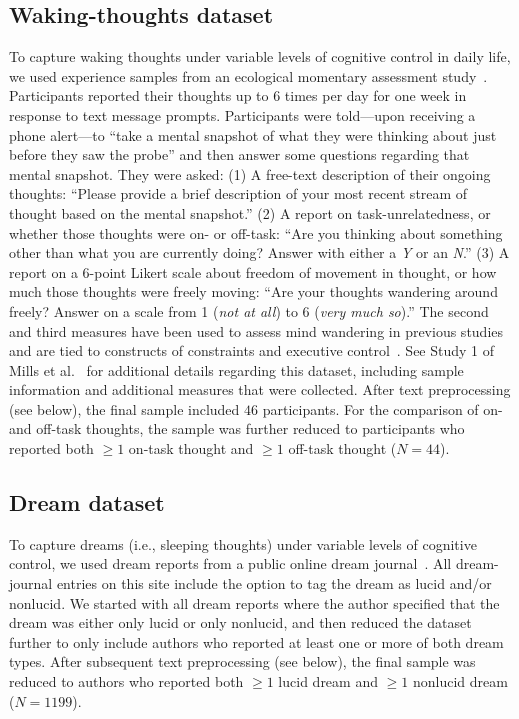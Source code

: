 \documentclass[10pt,a4paper,twocolumn]{article}
\begin{document}
\subsection*{Waking-thoughts dataset}
To capture waking thoughts under variable levels of cognitive control in daily life, we used experience samples from an ecological momentary assessment study~\cite{mills2021}. Participants reported their thoughts up to 6 times per day for one week in response to text message prompts. Participants were told---upon receiving a phone alert---to ``take a mental snapshot of what they were thinking about just before they saw the probe'' and then answer some questions regarding that mental snapshot. They were asked: (1) A free-text description of their ongoing thoughts: ``Please provide a brief description of your most recent stream of thought based on the mental snapshot.'' (2) A report on task-unrelatedness, or whether those thoughts were on- or off-task: ``Are you thinking about something other than what you are currently doing? Answer with either a \textit{Y} or an \textit{N}.'' (3) A report on a 6-point Likert scale about freedom of movement in thought, or how much those thoughts were freely moving: ``Are your thoughts wandering around freely? Answer on a scale from 1 (\textit{not at all}) to 6 (\textit{very much so}).'' The second and third measures have been used to assess mind wandering in previous studies and are tied to constructs of constraints and executive control~\cite{mills2018a}. See Study 1 of Mills et al.~\cite{mills2021} for additional details regarding this dataset, including sample information and additional measures that were collected. After text preprocessing (see below), the final sample included $46$ participants. For the comparison of on- and off-task thoughts, the sample was further reduced to participants who reported both $\ge 1$ on-task thought and $\ge 1$ off-task thought ($\mathit{N}=44$).

\subsection*{Dream dataset}
To capture dreams (i.e., sleeping thoughts) under variable levels of cognitive control, we used dream reports from a public online dream journal~\cite{dreamviews,schredl2022}. All dream-journal entries on this site include the option to tag the dream as lucid and/or nonlucid. We started with all dream reports where the author specified that the dream was either only lucid or only nonlucid, and then reduced the dataset further to only include authors who reported at least one or more of both dream types. After subsequent text preprocessing (see below), the final sample was reduced to authors who reported both $\ge 1$ lucid dream and $\ge 1$ nonlucid dream ($\mathit{N}=1199$).
\end{document}
